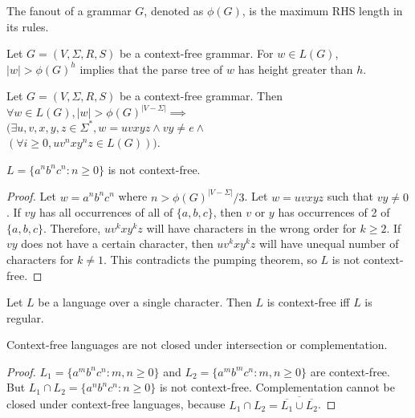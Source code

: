 \begin{definition}
The fanout of a grammar $G$, denoted as $\phi(G)$, is the maximum RHS length in its rules.
\end{definition}
\begin{lemma}
Let $G = (V, \Sigma, R, S)$ be a context-free grammar.
For $w \in L(G)$, $|w| > \phi(G)^h$ implies that the parse tree of $w$ has height greater than $h$.
\end{lemma}
\begin{theorem}
Let $G = (V, \Sigma, R, S)$ be a context-free grammar.
Then $\forall w \in L(G), |w| > \phi(G)^{|V - \Sigma|} \implies$\\
$(\exists u, v, x, y, z \in \Sigma^*, w = uvxyz \wedge vy \neq e \wedge$\\
$(\forall i \ge 0, uv^nxy^nz \in L(G)))$.
\end{theorem}

\begin{corollary}
$L = \{a^nb^nc^n: n \ge 0\}$ is not context-free.
\end{corollary}
\begin{proof}
Let $w = a^nb^nc^n$ where $n > \phi(G)^{|V-\Sigma|}/3$.
Let $w = uvxyz$ such that $vy \neq 0$.
If $vy$ has all occurrences of all of $\{a, b, c\}$,
then $v$ or $y$ has occurrences of 2 of $\{a, b, c\}$.
Therefore, $uv^kxy^kz$ will have characters in the wrong order for $k \ge 2$.
If $vy$ does not have a certain character,
then $uv^kxy^kz$ will have unequal number of characters for $k \neq 1$.
This contradicts the pumping theorem, so $L$ is not context-free.
\end{proof}

\begin{theorem}
Let $L$ be a language over a single character.
Then $L$ is context-free iff $L$ is regular.
\end{theorem}

\begin{theorem}
Context-free languages are not closed under intersection or complementation.
\end{theorem}
\begin{proof}
$L_1 = \{a^mb^nc^n: m, n \ge 0\}$ and $L_2 = \{a^mb^mc^n: m, n \ge 0\}$ are context-free.
But $L_1 \cap L_2 = \{a^nb^nc^n: n \ge 0\}$ is not context-free.
Complementation cannot be closed under context-free languages,
because $L_1 \cap L_2 = \overline{\overline{L_1} \cup \overline{L_2}}$.
\end{proof}

